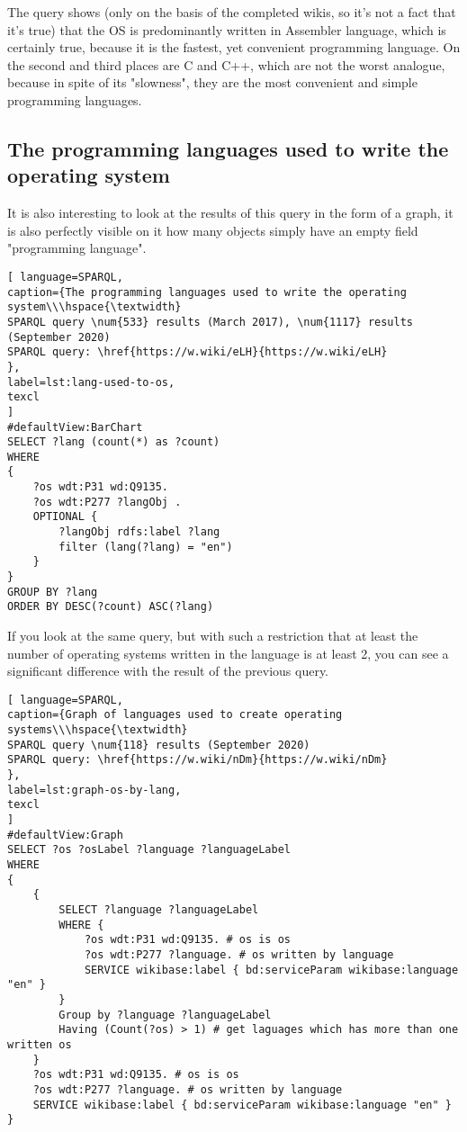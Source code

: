 The query shows (only on the basis of the completed wikis, so it's not a fact that it's true) that the OS is predominantly written in Assembler language, which is certainly true, because it is the fastest, yet convenient programming language. On the second and third places are C and C++, which are not the worst analogue, because in spite of its "slowness", they are the most convenient and simple programming languages.

\subsection{The programming languages used to write the operating system}

It is also interesting to look at the results of this query in the form of a graph, it is also perfectly visible on it how many objects simply have an empty field "programming language".

\begin{lstlisting}[ language=SPARQL, 
caption={The programming languages used to write the operating system\\\hspace{\textwidth}
SPARQL query \num{533} results (March 2017), \num{1117} results (September 2020)
SPARQL query: \href{https://w.wiki/eLH}{https://w.wiki/eLH}
},
label=lst:lang-used-to-os,
texcl 
]
#defaultView:BarChart
SELECT ?lang (count(*) as ?count)
WHERE 
{
	?os wdt:P31 wd:Q9135.
	?os wdt:P277 ?langObj .
	OPTIONAL {
		?langObj rdfs:label ?lang
		filter (lang(?lang) = "en")
	}
}
GROUP BY ?lang
ORDER BY DESC(?count) ASC(?lang)
\end{lstlisting}

If you look at the same query, but with such a restriction that at least the number of operating systems written in the language is at least 2, you can see a significant difference with the result of the previous query.


\begin{lstlisting}[ language=SPARQL, 
caption={Graph of languages used to create operating systems\\\hspace{\textwidth}
SPARQL query \num{118} results (September 2020)
SPARQL query: \href{https://w.wiki/nDm}{https://w.wiki/nDm}
},
label=lst:graph-os-by-lang,
texcl 
]
#defaultView:Graph
SELECT ?os ?osLabel ?language ?languageLabel
WHERE
{
	{
		SELECT ?language ?languageLabel
		WHERE {
			?os wdt:P31 wd:Q9135. # os is os
			?os wdt:P277 ?language. # os written by language
			SERVICE wikibase:label { bd:serviceParam wikibase:language "en" }
		} 
		Group by ?language ?languageLabel 
		Having (Count(?os) > 1) # get laguages which has more than one written os
	}
	?os wdt:P31 wd:Q9135. # os is os
	?os wdt:P277 ?language. # os written by language
	SERVICE wikibase:label { bd:serviceParam wikibase:language "en" }
}
\end{lstlisting}


